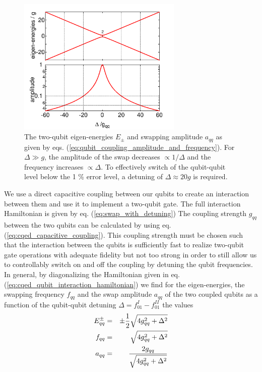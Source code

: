 \begin{figure}
	\centering
	\includegraphics[width=0.7\textwidth]{./material/mathematica/qubit_qubit_coupling}
	\caption[]{The two-qubit eigen-energies $E_\pm$ and swapping amplitude $a_{qq}$ as given by eqs. (\ref{eq:qubit_coupling_amplitude_and_frequency}). For $\Delta \gg g$, the amplitude of the swap decreases $\propto 1/\Delta$ and the frequency increases $\propto \Delta$. To effectively switch of the qubit-qubit level below the 1 \% error level, a detuning of $\Delta \approx 20 g$ is required.}
	\label{fig:qubit_coupling_amplitude_and_frequency}
\end{figure}

We use a direct capacitive coupling between our qubits to create an interaction between them and use it to implement a two-qubit gate. The full interaction Hamiltonian is given by eq. (\ref{eq:swap_with_detuning}) The coupling strength $g_{qq}$ between the two qubits can be calculated by using eq. (\ref{eq:cqed_capacitive_coupling}). This coupling strength must be chosen such that the interaction between the qubits is sufficiently fast to realize two-qubit gate operations with adequate fidelity but not too strong in order to still allow us to controllably switch on and off the coupling by detuning the qubit frequencies. In general, by diagonalizing the Hamiltonian given in eq. (\ref{eq:cqed_qubit_interaction_hamiltonian}) we find for the eigen-energies, the swapping frequency $f_{qq}$ and the swap amplitude $a_{qq}$ of the two coupled qubits as a function of the qubit-qubit detuning $\Delta=f_{01}^I-f_{01}^{II}$ the values
%
\begin{eqnarray}
E_{qq}^\pm & = & \pm\frac{1}{2}\sqrt{4g_{qq}^2+\Delta^2} \notag \\
f_{qq}     & = & \sqrt{4g_{qq}^2+\Delta^2} \notag \\
a_{qq}     & = & \frac{2g_{qq}}{\sqrt{4g_{qq}^2+\Delta^2}} \label{eq:qubit_coupling_amplitude_and_frequency}
\end{eqnarray}
%

